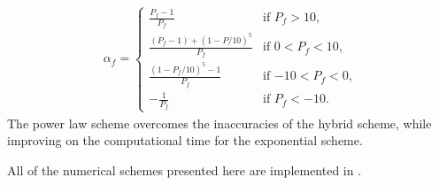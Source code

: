 \begin{description}
\begin{eqnarray}
\alpha_f = 
\begin{cases}
    \frac{P_f-1}{P_f} & \text{if $P_f > 10$,} \\
    \frac{(P_f-1)+(1-P/10)^5}{P_f} & \text{if $0 < P_f < 10$,} \\
    \frac{(1-P_f/10)^5 - 1}{P_f} & \text{if $-10 < P_f < 0$,} \\
    -\frac{1}{P_f} & \text{if $P_f < -10$.}
\end{cases}
\label{eqn:num:pls}
\end{eqnarray}
The power law scheme overcomes the inaccuracies of the hybrid scheme,
while improving on the computational time for the exponential scheme.
\end{description}

All of the numerical schemes presented here are implemented in \FiPy{}.







